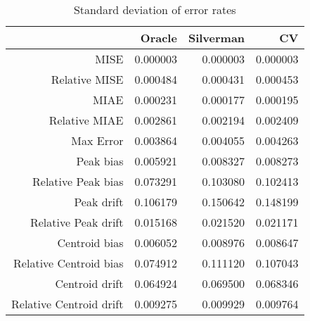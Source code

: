 \begin{table}[ht]
\centering
\begin{tabular}{rrrr}
  \hline
 & Oracle & Silverman & CV \\ 
  \hline
MISE & 0.000003 & 0.000003 & 0.000003 \\ 
  Relative MISE & 0.000484 & 0.000431 & 0.000453 \\ 
  MIAE & 0.000231 & 0.000177 & 0.000195 \\ 
  Relative MIAE & 0.002861 & 0.002194 & 0.002409 \\ 
  Max Error & 0.003864 & 0.004055 & 0.004263 \\ 
  Peak bias & 0.005921 & 0.008327 & 0.008273 \\ 
  Relative Peak bias & 0.073291 & 0.103080 & 0.102413 \\ 
  Peak drift & 0.106179 & 0.150642 & 0.148199 \\ 
  Relative Peak drift & 0.015168 & 0.021520 & 0.021171 \\ 
  Centroid bias & 0.006052 & 0.008976 & 0.008647 \\ 
  Relative Centroid bias & 0.074912 & 0.111120 & 0.107043 \\ 
  Centroid drift & 0.064924 & 0.069500 & 0.068346 \\ 
  Relative Centroid drift & 0.009275 & 0.009929 & 0.009764 \\ 
   \hline
\end{tabular}
\caption{Standard deviation of error rates} 
\label{tbl:stddev_error_rates}
\end{table}
